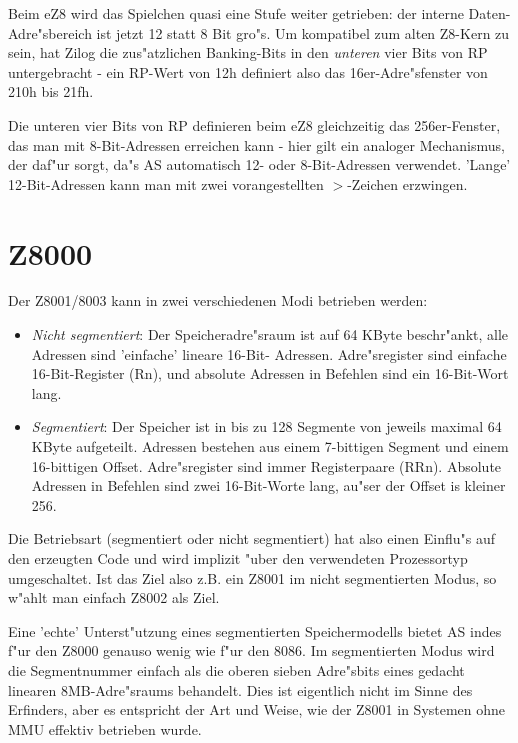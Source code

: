 \documentclass[12pt,a4paper,twoside]{report}
\begin{document}
Beim eZ8 wird das Spielchen quasi eine Stufe weiter getrieben: der
interne Daten-Adre"sbereich ist jetzt 12 statt 8 Bit gro"s.  Um
kompatibel zum alten Z8-Kern zu sein, hat Zilog die zus"atzlichen
Banking-Bits in den {\em unteren} vier Bits von RP untergebracht -
ein RP-Wert von 12h definiert also das 16er-Adre"sfenster von 210h
bis 21fh.

Die unteren vier Bits von RP definieren beim eZ8 gleichzeitig das
256er-Fenster, das man mit 8-Bit-Adressen erreichen kann - hier gilt
ein analoger Mechanismus, der daf"ur sorgt, da"s AS automatisch 12-
oder 8-Bit-Adressen verwendet.  'Lange' 12-Bit-Adressen kann man mit
zwei vorangestellten $>$-Zeichen erzwingen.


\section{Z8000}
\label{Z8000Spec}

Der Z8001/8003 kann in zwei verschiedenen Modi betrieben werden:
\begin{itemize}
\item{{\em Nicht segmentiert}: Der Speicheradre"sraum ist auf 64 KByte
      beschr"ankt, alle Adressen sind 'einfache' lineare 16-Bit-
      Adressen.  Adre"sregister sind einfache 16-Bit-Register (Rn),
      und absolute Adressen in Befehlen sind ein 16-Bit-Wort lang.}
\item{{\em Segmentiert}: Der Speicher ist in bis zu 128 Segmente von
      jeweils maximal 64 KByte aufgeteilt.  Adressen bestehen aus
      einem 7-bittigen Segment und einem 16-bittigen Offset.  Adre"sregister
      sind immer Registerpaare (RRn).  Absolute Adressen in Befehlen
      sind zwei 16-Bit-Worte lang, au"ser der Offset is kleiner 256.}
\end{itemize}

Die Betriebsart (segmentiert oder nicht segmentiert) hat also einen
Einflu"s auf den erzeugten Code und wird implizit "uber den verwendeten
Prozessortyp umgeschaltet.  Ist das Ziel also z.B. ein Z8001 im nicht
segmentierten Modus, so w"ahlt man einfach Z8002 als Ziel.

Eine 'echte' Unterst"utzung eines segmentierten Speichermodells bietet
AS indes f"ur den Z8000 genauso wenig wie f"ur den 8086.  Im segmentierten
Modus wird die Segmentnummer einfach als die oberen sieben Adre"sbits
eines gedacht linearen 8MB-Adre"sraums behandelt.  Dies ist eigentlich
nicht im Sinne des Erfinders, aber es entspricht der Art und Weise, wie
der Z8001 in Systemen ohne MMU effektiv betrieben wurde.
\end{document}
